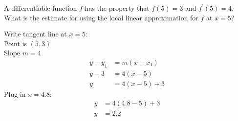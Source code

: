 \documentclass[12pt,letterpaper, onecolumn]{exam}
\begin{document}
\begin{questions}
\question
A differentiable function $f$ has the property that $f(5)=3$ and $f^\prime(5)=4$. What is the estimate for 
using the local linear approximation for $f$ at $x = 5$?

\begin{solution}
	Write tangent line at $x=5$: \\
	Point is $(5,3)$ \\
	Slope $m=4$ \\
	\begin{align}
		y-y_{1} &= m(x-x_1) \\
		y-3 &= 4(x-5) \\
		y &= 4(x-5) + 3
	\end{align}
	Plug in $x=4.8$:
	\begin{align}
		y &= 4(4.8-5) + 3 \\
		y &= \boxed{2.2}
	\end{align}
\end{solution}

\end{questions}
\end{document}
